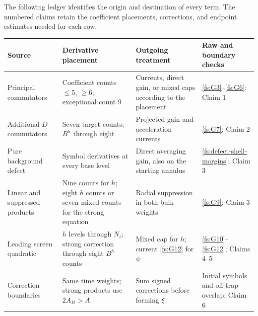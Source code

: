 The following ledger identifies the origin and destination of every term.
The numbered claims retain the coefficient placements, corrections, and
endpoint estimates needed for each row.
\begin{center}
\small
\begin{tabular}{@{}>{\raggedright\arraybackslash}p{.20\linewidth}
                  >{\raggedright\arraybackslash}p{.21\linewidth}
                  >{\raggedright\arraybackslash}p{.24\linewidth}
                  >{\raggedright\arraybackslash}p{.25\linewidth}@{}}
\toprule
Source & Derivative placement & Outgoing treatment & Raw and boundary checks \\
\midrule
Principal commutators & Coefficient counts $\le5$, $\ge6$;
exceptional count $9$ & Currents, direct gain, or mixed caps according
to the placement & \eqref{fs:G3}--\eqref{fs:G6}; Claim 1 \\[3pt]
Additional $D$ commutators & Seven target counts; $B^h$ through eight
& Projected gain and acceleration currents
& \eqref{fs:G7}; Claim 2 \\[3pt]
Pure background defect & Symbol derivatives at every base level
& Direct averaging gain, also on the starting annulus
& \eqref{fs:defect-shell-margins}; Claim 3 \\[3pt]
Linear and suppressed products & Nine counts for $h$; eight $h$ counts
or seven mixed counts for the strong equation
& Radial suppression in both bulk weights
& \eqref{fs:G9}; Claim 3 \\[3pt]
Leading screen quadratic & $h$ levels through $N_i$; strong correction
through eight $B^h$ counts
& Mixed cap for $h$; current \eqref{fs:G12} for $\psi$
& \eqref{fs:G10}--\eqref{fs:G12}; Claims 4--5 \\[3pt]
Correction boundaries & Same time weights; strong products use $2A_H>A$
& Sum signed corrections before forming $\xi$
& Initial symbols and off-trap overlap; Claim 6 \\
\bottomrule
\end{tabular}
\end{center}


